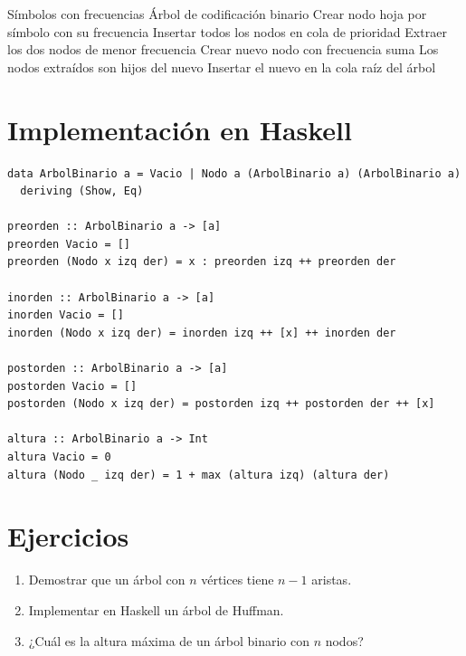 \begin{algorithm}[htbp]
\caption{Algoritmo de Huffman}
\begin{algorithmic}[1]
\Require Símbolos con frecuencias
\Ensure Árbol de codificación binario
\State Crear nodo hoja por símbolo con su frecuencia
\State Insertar todos los nodos en cola de prioridad
  \State Extraer los dos nodos de menor frecuencia
  \State Crear nuevo nodo con frecuencia suma
  \State Los nodos extraídos son hijos del nuevo
  \State Insertar el nuevo en la cola
\EndWhile
\State \Return raíz del árbol
\end{algorithmic}
\end{algorithm}

\section{Implementación en Haskell}

\begin{lstlisting}[caption={Árboles binarios en Haskell}]
data ArbolBinario a = Vacio | Nodo a (ArbolBinario a) (ArbolBinario a)
  deriving (Show, Eq)

preorden :: ArbolBinario a -> [a]
preorden Vacio = []
preorden (Nodo x izq der) = x : preorden izq ++ preorden der

inorden :: ArbolBinario a -> [a]
inorden Vacio = []
inorden (Nodo x izq der) = inorden izq ++ [x] ++ inorden der

postorden :: ArbolBinario a -> [a]
postorden Vacio = []
postorden (Nodo x izq der) = postorden izq ++ postorden der ++ [x]

altura :: ArbolBinario a -> Int
altura Vacio = 0
altura (Nodo _ izq der) = 1 + max (altura izq) (altura der)
\end{lstlisting}

\section{Ejercicios}
\begin{enumerate}
  \item Demostrar que un árbol con $n$ vértices tiene $n-1$ aristas.
  \item Implementar en Haskell un árbol de Huffman.
  \item ¿Cuál es la altura máxima de un árbol binario con $n$ nodos?
\end{enumerate}